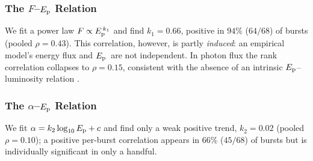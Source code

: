 \documentclass[twocolumn]{aastex631}
\newcommand{\Ep}{\ensuremath{E_{\rm p}}}
\begin{document}
\subsubsection{The $F$--$\Ep$ Relation}
We fit a power law $F\propto\Ep^{\,k_1}$ and find $k_1=0.66$, positive in $94\%$
($64/68$) of bursts (pooled $\rho=0.43$). This correlation, however, is partly
\emph{induced}: an empirical model's energy flux and \Ep\ are not independent. In
photon flux the rank correlation collapses to $\rho=0.15$, consistent with the
absence of an intrinsic $\Ep$--luminosity relation \citep{Mei2025}.

\subsubsection{The $\alpha$--$\Ep$ Relation}
We fit $\alpha=k_2\log_{10}\Ep+c$ and find only a weak positive trend,
$k_2=0.02$ (pooled $\rho=0.10$); a positive per-burst correlation appears in
$66\%$ ($45/68$) of bursts but is individually significant in only a handful.
\end{document}
